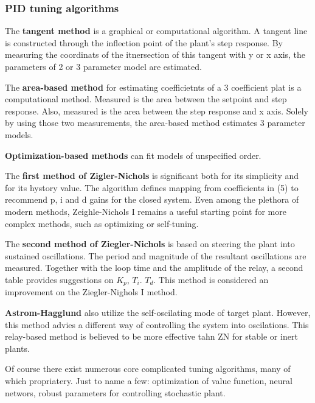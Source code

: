 \subsubsection{PID tuning algorithms}
The \textbf{tangent method} is a graphical or computational algorithm.
A tangent line is constructed through the inflection point of the plant's step response.
By measuring the coordinats of the itnersection of this tangent with y or x axis,
the parameters of 2 or 3 parameter model are estimated.
\par
The \textbf{area-based method} for estimating coefficietnts of a 3 coefficient plat is a computational method.
Measured is the area between the setpoint and step response.
Also, measured is the area between the step response and x axis.
Solely by using those two measurements, the area-based method estimates 3 parameter models.
\par
\textbf{Optimization-based methods} can fit models of unspecified order.
\par
The \textbf{first method of Zigler-Nichols} is significant both for its simplicity and for its hystory value.
The algorithm defines mapping from coefficients in (5) to recommend p, i and d gains for the closed system.
Even among the plethora of modern methods, Zeighle-Nichols I remains a useful starting point for more complex methods, such as optimizing or self-tuning.
\par
The \textbf{second method of Ziegler-Nichols} is based on steering the plant into sustained oscillations.
The period and magnitude of the resultant oscillations are measured.
Together with the loop time and the amplitude of the relay, a second table provides suggestions on $K_p$, $T_i$. $T_d$.
This method is considered an improvement on the Ziegler-Nighols I method.
\par
\textbf{Astrom-Hagglund} also utilize the self-oscilating mode of target plant.
However, this method advies a different way of controlling the system into oscilations.
This relay-based method is believed to be more effective tahn ZN for stable or inert plants.
\par
Of course there exist numerous core complicated tuning algorithms, many of which propriatery.
Just to name a few: optimization of value function, neural networs, robust parameters for controlling stochastic plant.

